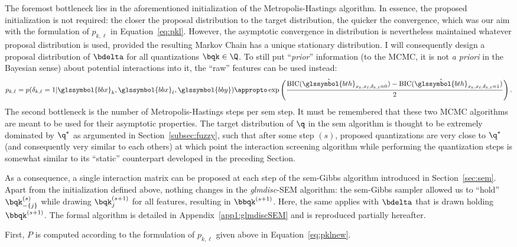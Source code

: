 The foremost bottleneck lies in the aforementioned initialization of the Metropolis-Hastings algorithm. In essence, the proposed initialization is not required: the closer the proposal distribution to the target distribution, the quicker the convergence, which was our aim with the formulation of $p_{k,\ell}$ in Equation~\eqref{eq:pkl}. However, the asymptotic convergence in distribution is nevertheless maintained whatever proposal distribution is used, provided the resulting Markov Chain has a unique stationary distribution. I will consequently design a proposal distribution of $\bdelta$ for all quantizations $\bqk \in \Q$. To still put ``\textit{prior}'' information (to the MCMC, it is not \textit{a priori} in the Bayesian sense) about potential interactions into it, the ``raw'' features can be used instead:
\begin{equation} \label{eq:pklnew}
p_{k,\ell} = p(\delta_{k,\ell} = 1 | \glssymbol{bbx}_k, \glssymbol{bbx}_\ell, \glssymbol{bby}) \appropto \exp \left( \frac{\text{BIC}(\hat{\glssymbol{bth}}_{x_k,x_\ell,\delta_{k,\ell}=0}) - \text{BIC}(\hat{\glssymbol{bth}}_{x_k,x_\ell,\delta_{k,\ell}=1})}{2} \right).
\end{equation}
The second bottleneck is the number of Metropolis-Hastings steps per \gls{sem} step. It must be remembered that these two MCMC algorithms are meant to be used for their asymptotic properties. The target distribution of $\q$ in the \gls{sem} algorithm is thought to be extremely dominated by $\q^\star$ as argumented in Section~\ref{subsec:fuzzy}, such that after some step $(s)$, proposed quantizations are very close to $\q^\star$ (and consequently very similar to each others) at which point the interaction screening algorithm while performing the quantization steps is somewhat similar to its ``static'' counterpart developed in the preceding Section.

As a consequence, a single interaction matrix can be proposed at each step of the \gls{sem}-Gibbs algorithm introduced in Section~\ref{sec:sem}. Apart from the initialization defined above, nothing changes in the \textit{glmdisc}-SEM algorithm: the \gls{sem}-Gibbs sampler allowed us to ``hold'' $\bqk_{-\{j\}}^{(s)}$ while drawing $\bqk_{j}^{(s+1)}$ for all features, resulting in $\bbqk^{(s+1)}$. Here, the same applies with $\bdelta$ that is drawn holding $\bbqk^{(s+1)}$. The formal algorithm is detailed in Appendix~\ref{app1:glmdiscSEM} and is reproduced partially hereafter.

First, $P$ is computed according to the formulation of $p_{k,\ell}$ given above in Equation~\eqref{eq:pklnew}.

